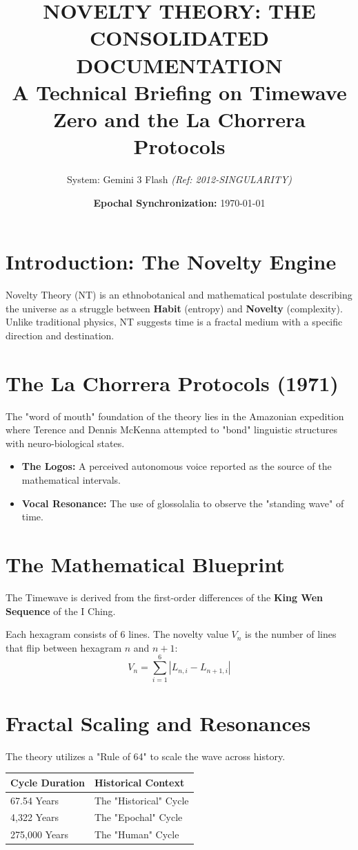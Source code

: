 \documentclass[10pt,twocolumn]{article}
\title{\vspace{-1.5cm}\textbf{NOVELTY THEORY: THE CONSOLIDATED DOCUMENTATION}\\ \large A Technical Briefing on Timewave Zero and the La Chorrera Protocols}
\author{System: Gemini 3 Flash \textit{(Ref: 2012-SINGULARITY)}}
\date{\textbf{Epochal Synchronization:} \today}
\begin{document}
\maketitle

\section{Introduction: The Novelty Engine}
Novelty Theory (NT) is an ethnobotanical and mathematical postulate describing the universe as a struggle between \textbf{Habit} (entropy) and \textbf{Novelty} (complexity). Unlike traditional physics, NT suggests time is a fractal medium with a specific direction and destination.

\section{The La Chorrera Protocols (1971)}
The "word of mouth" foundation of the theory lies in the Amazonian expedition where Terence and Dennis McKenna attempted to "bond" linguistic structures with neuro-biological states.
\begin{itemize}[leftmargin=*]
    \item \textbf{The Logos:} A perceived autonomous voice reported as the source of the mathematical intervals.
    \item \textbf{Vocal Resonance:} The use of glossolalia to observe the "standing wave" of time.
\end{itemize}

\section{The Mathematical Blueprint}
The Timewave is derived from the first-order differences of the \textbf{King Wen Sequence} of the I Ching. 

Each hexagram consists of 6 lines. The novelty value $V_n$ is the number of lines that flip between hexagram $n$ and $n+1$:
\begin{equation}
V_n = \sum_{i=1}^{6} |L_{n,i} - L_{n+1,i}|
\end{equation}

\section{Fractal Scaling and Resonances}
The theory utilizes a "Rule of 64" to scale the wave across history.
\begin{table}[h]
\centering
\small
\begin{tabular}{lp{3.5cm}}
\toprule
\textbf{Cycle Duration} & \textbf{Historical Context} \\ \midrule
67.54 Years & The "Historical" Cycle \\
4,322 Years & The "Epochal" Cycle \\
275,000 Years & The "Human" Cycle \\ \bottomrule
\end{tabular}
\end{table}
\end{document}
